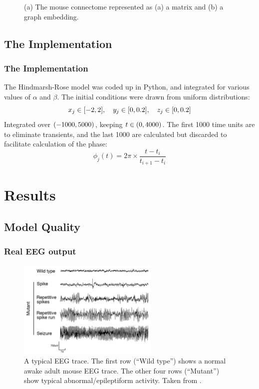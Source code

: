 \documentclass[hyperref={hidelinks}]{beamer}
\newcommand*{\hrx}{x}
\newcommand*{\hra}{\alpha}
\newcommand*{\hrb}{\beta}
\newcommand*{\phase}{\phi}
\begin{document}
\begin{frame}
\begin{figure}
\begin{subfigure}{0.49\textwidth}
      \caption{}
      \label{fig:connectome_embedding}
    \end{subfigure}
    \caption{(a) The mouse connectome represented as (a) a matrix and (b) a graph embedding.}
    \label{fig:connectome}
  \end{figure}

\end{frame}

\subsection{The Implementation}
\begin{frame}
  \frametitle{The Implementation}
  The Hindmarsh-Rose model was coded up in Python, and integrated for various values of $\hra$ and $\hrb$.
  The initial conditions were drawn from uniform distributions:
  \begin{equation*}
    \hrx_{j} \in \bqty{-2, 2}
    \qc
    y_{j} \in \bqty{0, 0.2}
    \qc
    z_{j} \in \bqty{0, 0.2}
  \end{equation*}
  Integrated over $\pqty{-1000, 5000}$, keeping $t \in \pqty{0, 4000}$.
  The first 1000 time units are to eliminate transients, and the last 1000 are calculated but discarded to facilitate calculation of the phase:
  \begin{equation}
    \label{eq:hr_phase}
    \phase_{j}(t)
    =
    2 \pi \times \frac{t - t_{i}}{t_{i + 1} - t_{i}}
  \end{equation}

\end{frame}

\section{Results}
\subsection{Model Quality}
\begin{frame}
  \frametitle{Real EEG output}
  \begin{figure}[ht]
    \centering
    \includegraphics[width=0.6\textwidth]{figure/eeg}
    \caption[Typical EEG trace]{A typical EEG trace.
      The first row (``Wild type'') shows a normal awake adult mouse EEG trace.
      The other four rows (``Mutant'') show typical abnormal/epileptiform activity.
      Taken from \cite{Ljungberg2009}.
    }
    \label{fig:eeg}
  \end{figure}

\end{frame}
\end{document}
